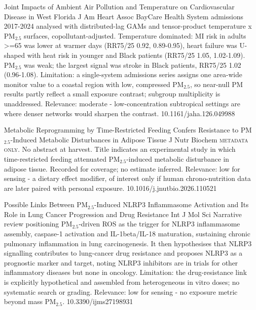 \documentclass[10pt]{article}
\begin{document}
{Joint Impacts of Ambient Air Pollution and Temperature on Cardiovascular Disease in West Florida}
{J Am Heart Assoc}
{BayCare Health System admissions 2017-2024 analysed with distributed-lag GAMs and tensor-product temperature x PM$_{2.5}$ surfaces, copollutant-adjusted. Temperature dominated: MI risk in adults >=65 was lower at warmer days (RR75/25 0.92, 0.89-0.95), heart failure was U-shaped with heat risk in younger and Black patients (RR75/25 1.05, 1.02-1.09). PM$_{2.5}$ was weak; the largest signal was stroke in Black patients, RR75/25 1.02 (0.96-1.08). Limitation: a single-system admissions series assigns one area-wide monitor value to a coastal region with low, compressed PM$_{2.5}$, so near-null PM results partly reflect a small exposure contrast; subgroup multiplicity is unaddressed. Relevance: moderate - low-concentration subtropical settings are where denser networks would sharpen the contrast.}
{10.1161/jaha.126.049988}

\par{}\baselineskip{}\baselineskip
{}

{Metabolic Reprogramming by Time-Restricted Feeding Confers Resistance to PM$_{2.5}$-Induced Metabolic Disturbances in Adipose Tissue}
{J Nutr Biochem}
{\textsc{metadata only.} No abstract at harvest. Title indicates an experimental study in which time-restricted feeding attenuated PM$_{2.5}$-induced metabolic disturbance in adipose tissue. Recorded for coverage; no estimate inferred. Relevance: low for sensing - a dietary effect modifier, of interest only if human chrono-nutrition data are later paired with personal exposure.}
{10.1016/j.jnutbio.2026.110521}

{Possible Links Between PM$_{2.5}$-Induced NLRP3 Inflammasome Activation and Its Role in Lung Cancer Progression and Drug Resistance}
{Int J Mol Sci}
{Narrative review positioning PM$_{2.5}$-driven ROS as the trigger for NLRP3 inflammasome assembly, caspase-1 activation and IL-1beta/IL-18 maturation, sustaining chronic pulmonary inflammation in lung carcinogenesis. It then hypothesises that NLRP3 signalling contributes to lung-cancer drug resistance and proposes NLRP3 as a prognostic marker and target, noting NLRP3 inhibitors are in trials for other inflammatory diseases but none in oncology. Limitation: the drug-resistance link is explicitly hypothetical and assembled from heterogeneous in vitro doses; no systematic search or grading. Relevance: low for sensing - no exposure metric beyond mass PM$_{2.5}$.}
{10.3390/ijms27198931}
\end{document}
